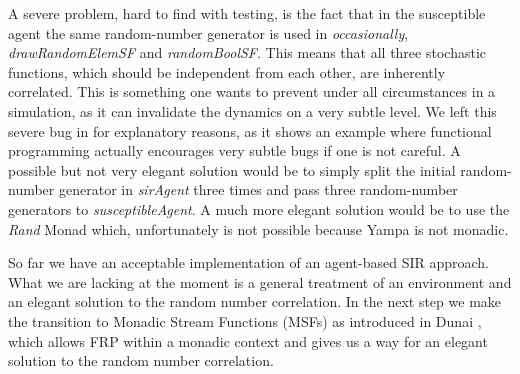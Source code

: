 A severe problem, hard to find with testing, is the fact that in the susceptible agent the same random-number generator is used in \textit{occasionally}, \textit{drawRandomElemSF} and \textit{randomBoolSF}. This means that all three stochastic functions, which should be independent from each other, are inherently correlated. This is something one wants to prevent under all circumstances in a simulation, as it can invalidate the dynamics on a very subtle level. We left this severe bug in for explanatory reasons, as it shows an example where functional programming actually encourages very subtle bugs if one is not careful. A possible but not very elegant solution would be to simply split the initial random-number generator in \textit{sirAgent} three times and pass three random-number generators to \textit{susceptibleAgent}. A much more elegant solution would be to use the \textit{Rand} Monad which, unfortunately is not possible because Yampa is not monadic.

So far we have an acceptable implementation of an agent-based SIR approach. What we are lacking at the moment is a general treatment of an environment and an elegant solution to the random number correlation. In the next step we make the transition to Monadic Stream Functions (MSFs) as introduced in Dunai \cite{perez_functional_2016}, which allows FRP within a monadic context and gives us a way for an elegant solution to the random number correlation.